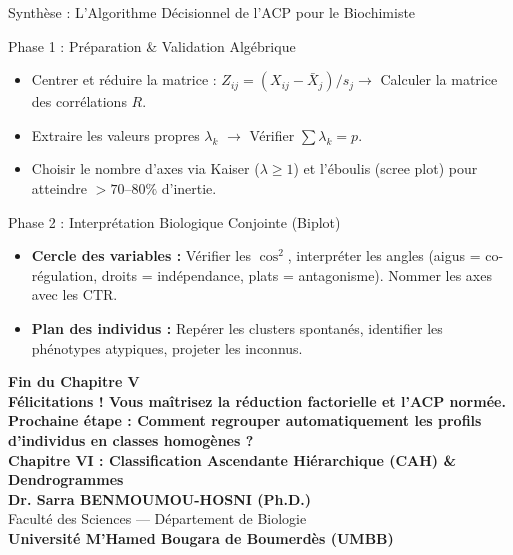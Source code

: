 \documentclass[aspectratio=169,10pt]{beamer}
\begin{document}
\begin{frame}{Synthèse : L'Algorithme Décisionnel de l'ACP pour le Biochimiste}
  \begin{conceptbox}{Phase 1 : Préparation \& Validation Algébrique}
    \footnotesize
    \begin{itemize}
      \item Centrer et réduire la matrice : $Z_{ij} = (X_{ij} - \bar{X}_j)/s_j \longrightarrow$ Calculer la matrice des corrélations $R$.
      \item Extraire les valeurs propres $\lambda_k$ $\longrightarrow$ Vérifier $\sum \lambda_k = p$.
      \item Choisir le nombre d'axes via Kaiser ($\lambda \ge 1$) et l'éboulis (scree plot) pour atteindre $> 70\text{--}80\%$ d'inertie.
    \end{itemize}
  \end{conceptbox}
  \vspace{1mm}
  \begin{biobox}{Phase 2 : Interprétation Biologique Conjointe (Biplot)}
    \footnotesize
    \begin{itemize}
      \item \textbf{Cercle des variables :} Vérifier les $\cos^2$, interpréter les angles (aigus = co-régulation, droits = indépendance, plats = antagonisme). Nommer les axes avec les $\text{CTR}$.
      \item \textbf{Plan des individus :} Repérer les clusters spontanés, identifier les phénotypes atypiques, projeter les inconnus.
    \end{itemize}
  \end{biobox}
\end{frame}

\begin{frame}[plain]
  \begin{center}
    \vspace{1.5cm}
    {\Huge\color{BioNavy}\textbf{Fin du Chapitre V}}\\[0.6cm]
    {\large\color{BioTeal}\textbf{Félicitations ! Vous maîtrisez la réduction factorielle et l'ACP normée.}}\\[1.0cm]
    {\normalsize\textbf{Prochaine étape : Comment regrouper automatiquement les profils d'individus en classes homogènes ?}}\\[0.3cm]
    {\large\textbf{Chapitre VI : Classification Ascendante Hiérarchique (CAH) \& Dendrogrammes}}\\[1.2cm]
    \textbf{Dr. Sarra BENMOUMOU-HOSNI (Ph.D.)}\\
    \small Faculté des Sciences --- Département de Biologie\\
    \textbf{Université M'Hamed Bougara de Boumerdès (UMBB)}
  \end{center}
\end{frame}
\end{document}
